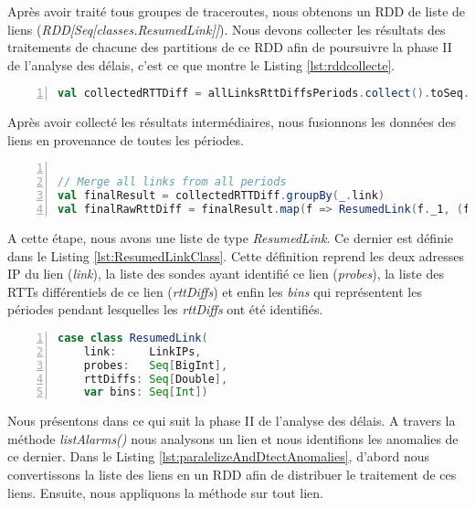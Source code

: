 Après avoir traité tous groupes de traceroutes, nous obtenons un RDD de liste de liens (\textit{RDD[Seq[classes.ResumedLink]]}). Nous devons collecter les résultats des traitements de chacune des partitions de ce RDD afin de poursuivre la phase II de l'analyse des délais, c'est ce que montre le Listing \ref{lst:rddcollecte}.

\begin{lstlisting}[language=scala,firstnumber=1, caption={Deduction des liens par groupe de traceroutes},label={lst:rddcollecte}, basicstyle = \footnotesize,escapechar=|,numbers=left,
stepnumber=1]
val collectedRTTDiff = allLinksRttDiffsPeriods.collect().toSeq.flatten
\end{lstlisting}


Après avoir collecté les résultats intermédiaires, nous fusionnons les données des liens en provenance de toutes les périodes. 

\begin{lstlisting}[language=scala,firstnumber=1, caption={Deduction des liens par groupe de traceroutes},label={lst:rddcollecte}, basicstyle = \footnotesize,escapechar=|,numbers=left,
stepnumber=1]

// Merge all links from all periods
val finalResult = collectedRTTDiff.groupBy(_.link)
val finalRawRttDiff = finalResult.map(f => ResumedLink(f._1, (f._2.map(_.probes)).flatten, (f._2.map(_.rttDiffs)).flatten, (f._2.map(_.bins)).flatten))
\end{lstlisting}


A cette étape, nous avons une liste de type \textit{ResumedLink}. Ce dernier est définie dans le Listing \ref{lst:ResumedLinkClass}. Cette définition reprend les deux  adresses IP du lien (\textit{link}), la liste des sondes ayant identifié ce lien (\textit{probes}), la liste des RTTs différentiels de ce lien (\textit{rttDiffs}) et enfin les \textit{bins} qui  représentent les périodes  pendant lesquelles les \textit{rttDiffs} ont été identifiés.

\begin{lstlisting}[language=scala,firstnumber=1, caption={Définition de la classe ResumedLink},label={lst:ResumedLinkClass}, basicstyle = \footnotesize,escapechar=|,numbers=left,
stepnumber=1]
case class ResumedLink(
	link:     LinkIPs,
	probes:   Seq[BigInt],
	rttDiffs: Seq[Double],
	var bins: Seq[Int])
\end{lstlisting}

Nous présentons dans ce qui suit la phase II de l'analyse des délais. A travers la méthode \textit{listAlarms()} nous analysons un lien et nous identifions les anomalies de ce dernier. Dans le Listing \ref{lst:paralelizeAndDtectAnomalies}, d'abord nous convertissons la liste des liens en un RDD afin de distribuer le traitement de ces liens. Ensuite, nous appliquons la méthode sur tout lien. 


